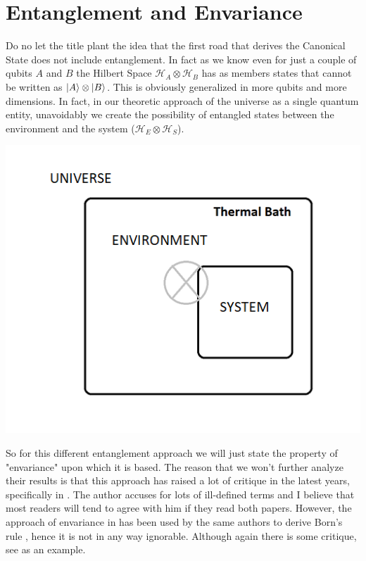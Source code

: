\documentclass[a4paper,12pt]{article}
\begin{document}
\section{Entanglement and Envariance}
Do no let the title plant the idea that the first road that derives the Canonical State does not include entanglement. In fact as we know even for just a couple of qubits $A$ and $B$ the Hilbert Space $\mathcal{H}_A \otimes \mathcal{H}_B$ has as members states that cannot be written as $\ket{A} \otimes \ket{B}$. This is obviously generalized in more qubits and more dimensions. In fact, in our theoretic approach of the universe as a single quantum entity, unavoidably we create the possibility of entangled states between the environment and the system ($\mathcal{H}_E \otimes \mathcal{H}_S $).
\begin{center}
\includegraphics{figures/photo}
\end{center}
\par
So for this different entanglement approach we will just state the property of "envariance" upon which it is based. The reason that we won't further analyze their results is that this approach has raised a lot of critique in the latest years, specifically in \cite{alicki2015comments}. The author accuses for lots of ill-defined terms and I believe that most readers will tend to agree with him if they read both papers. However, the approach of envariance in \cite{deffner2016foundations} has been used by the same authors to derive Born's rule \cite{zurek2003environment}, hence it is not in any way ignorable. Although again there is some critique, see \cite{schlosshauer2003zurek} as an example.
\end{document}
